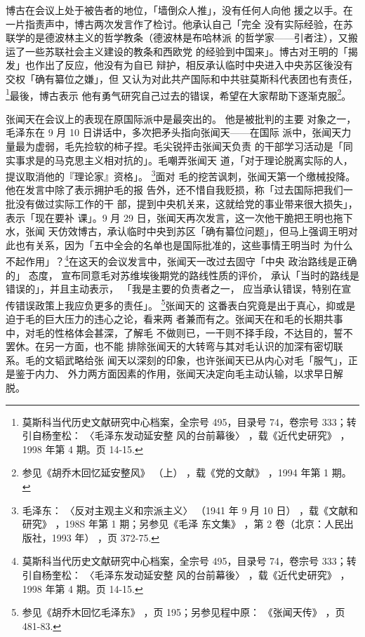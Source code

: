 博古在会议上处于被告者的地位，「墙倒众人推」，没有任何人向他
援之以手。在一片指责声中，博古两次发言作了检讨。他承认自己「完全
没有实际经验，在苏联学的是德波林主义的哲学教条（德波林是布哈林派
的哲学家——引者注），又搬运了一些苏联社会主义建设的教条和西欧党
的经验到中国来」。博古对王明的「揭发」也作出了反应，他没有为自已
辩护，相反承认临时中央进入中央苏区後没有交权「确有纂位之嫌」，但
又认为对此共产国际和中共驻莫斯科代表团也有责任，\footnote{莫斯科当代历史文献研究中心档案，全宗号 495，目录号 74，卷宗号 333；转引自杨奎松：
〈毛泽东发动延安整
风的台前幕後〉
，载《近代史研究》
，1998 年第 4 期。页 14-15.}最後，博古表示
他有勇气研究自己过去的错误，希望在大家帮助下逐渐克服\footnote{参见《胡乔木回忆延安整风》
（上）
，载《党的文献》
，1994 年第 1 期。
}。

张闻天在会议上的表现在原国际派中是最突出的。
他是被批判的主要
对象之一，毛泽东在 9 月 10 日讲话中，多次把矛头指向张闻天——在国际
派中，张闻天力量最为虚弱，毛先捡软的柿子捏。毛尖锐抨击张闻天负责
的干部学习活动是「同实事求是的马克思主义相对抗的」。毛嘲弄张闻天
道，「对于理论脱离实际的人，提议取消他的『理论家』资格」。
\footnote{毛泽东：
〈反对主观主义和宗派主义〉
（1941 年 9 月 10 日）
，载《文献和研究》
，198S 年第 1 期；另参见《毛泽
东文集》
，第 2 卷（北京：人民出版社，1993 年）
，页 372-75.}面对
毛的挖苦讽刺，张闻天第一个缴械投降。他在发言中除了表示拥护毛的报
告外，还不惜自我贬损，称「过去国际把我们一批没有做过实际工作的干
部，提到中央机关来，这就给党的事业带来很大损失」，表示「现在要补
课」。9 月 29 日，张闻天再次发言，这一次他干脆把王明也拖下水，张闻
天仿效博古，承认临时中央到苏区「确有纂位问题」，但马上强调王明对
此也有关系，因为「五中全会的名单也是国际批准的，这些事情王明当时
为什么不起作用」？\footnote{莫斯科当代历史文献研究中心档案，全宗号 495，目录号 74，卷宗号 333；转引自杨奎松：
〈毛泽东发动延安整
风的台前幕後〉
，载《近代史研究》
，1998 年第 4 期。页 14-15.}在这天的会议发言中，张闻天一改过去固守「中央
政治路线是正确的」
态度，
宣布同意毛对苏维埃後期党的路线性质的评价，
承认「当时的路线是错误的」，并且主动表示，
「我是主要的负责者之一，
应当承认错误，特别在宣传错误政策上我应负更多的责任」。
\footnote{参见《胡乔木回忆毛泽东》
，页 195；另参见程中原：
《张闻天传》
，页 481-83.}张闻天的
这番表白究竟是出于真心，抑或是迫于毛的巨大压力的违心之论，看来两
者兼而有之。张闻天在和毛的长期共事中，对毛的性格体会甚深，了解毛
不做则已，一干则不择手段，不达目的，誓不罢休。在另一方面，也不能
排除张闻天的大转弯与其对毛认识的加深有密切联系。毛的文韬武略给张
闻天以深刻的印象，也许张闻天已从内心对毛「服气」，正是鉴于内力、
外力两方面因素的作用，张闻天决定向毛主动认输，以求早日解脱。

